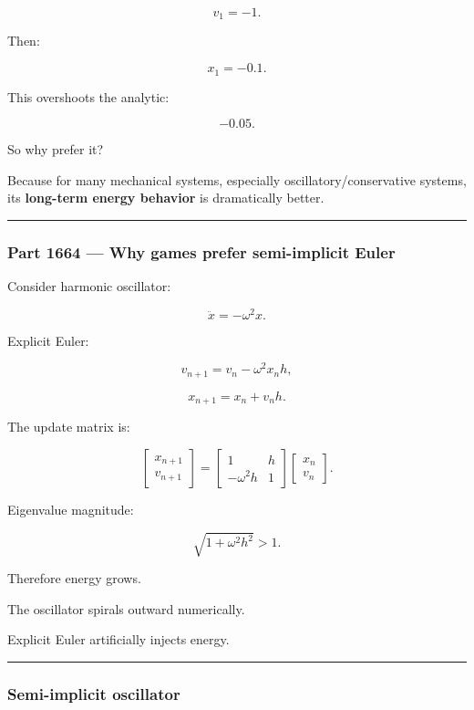 \[
v_1=-1.
\]

Then:

\[
x_1=-0.1.
\]

This overshoots the analytic:

\[
-0.05.
\]

So why prefer it?

Because for many mechanical systems, especially oscillatory/conservative systems, its \textbf{long-term energy behavior} is dramatically better.

\begin{center}\rule{0.5\linewidth}{0.5pt}\end{center}

\subsubsection{Part 1664 --- Why games prefer semi-implicit Euler}\label{part-1664-why-games-prefer-semi-implicit-euler}

Consider harmonic oscillator:

\[
\ddot x
=
-\omega^2x.
\]

Explicit Euler:

\[
v_{n+1}
=
v_n-\omega^2x_nh,
\]

\[
x_{n+1}
=
x_n+v_nh.
\]

The update matrix is:

\[
\begin{bmatrix}
x_{n+1}\\v_{n+1}
\end{bmatrix}
=
\begin{bmatrix}
1&h\\
-\omega^2h&1
\end{bmatrix}
\begin{bmatrix}
x_n\\v_n
\end{bmatrix}.
\]

Eigenvalue magnitude:

\[
\sqrt{1+\omega^2h^2}>1.
\]

Therefore energy grows.

The oscillator spirals outward numerically.

Explicit Euler artificially injects energy.

\begin{center}\rule{0.5\linewidth}{0.5pt}\end{center}

\subsubsection{Semi-implicit oscillator}\label{semi-implicit-oscillator}

